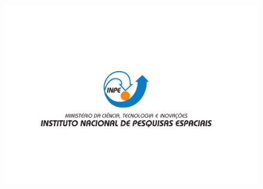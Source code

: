 \documentclass[10pt,aspectratio=169]{beamer}
\begin{document}
\begingroup
{}
{\nologo
\begin{frame}
  \begin{figure}[H]
    \vspace{-4em}
		\centering
    \hspace*{1.5em}\includegraphics[width=1.\textwidth]{DesinacaoNominativaCentralizada2020.pdf}
	\end{figure}
\end{frame}
}
\endgroup
\end{document}
